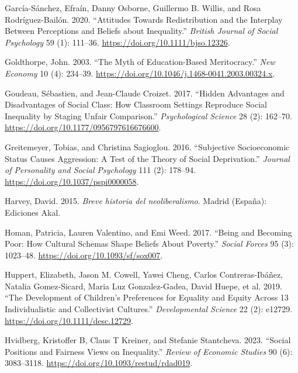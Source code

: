 \documentclass[
  letterpaper,
  DIV=11,
  numbers=noendperiod]{scrartcl}
\newlength{\cslhangindent}
\newlength{\cslentryspacingunit} %
\newenvironment{CSLReferences}[2] %
 {%
  \setlength{\parindent}{0pt}
  \ifodd #1
  \let\oldpar\par
  \def\par{\hangindent=\cslhangindent\oldpar}
  \fi
  \setlength{\parskip}{#2\cslentryspacingunit}
 }%
 {}
\begin{document}
\begin{CSLReferences}{1}{0}
\leavevmode{}%
García-Sánchez, Efraín, Danny Osborne, Guillermo B. Willis, and Rosa
Rodríguez-Bailón. 2020. {``Attitudes Towards Redistribution and the
Interplay Between Perceptions and Beliefs about Inequality.''}
\emph{British Journal of Social Psychology} 59 (1): 111--36.
\url{https://doi.org/10.1111/bjso.12326}.

\leavevmode{}%
Goldthorpe, John. 2003. {``The Myth of Education-Based Meritocracy.''}
\emph{New Economy} 10 (4): 234--39.
\url{https://doi.org/10.1046/j.1468-0041.2003.00324.x}.

\leavevmode{}%
Goudeau, Sébastien, and Jean-Claude Croizet. 2017. {``Hidden
{Advantages} and {Disadvantages} of {Social Class}: {How Classroom
Settings Reproduce Social Inequality} by {Staging Unfair Comparison}.''}
\emph{Psychological Science} 28 (2): 162--70.
\url{https://doi.org/10.1177/0956797616676600}.

\leavevmode{}%
Greitemeyer, Tobias, and Christina Sagioglou. 2016. {``Subjective
Socioeconomic Status Causes Aggression: {A} Test of the Theory of Social
Deprivation.''} \emph{Journal of Personality and Social Psychology} 111
(2): 178--94. \url{https://doi.org/10.1037/pspi0000058}.

\leavevmode{}%
Harvey, David. 2015. \emph{{Breve historia del neoliberalismo}}. Madrid
(Espa{ñ}a): Ediciones Akal.

\leavevmode{}%
Homan, Patricia, Lauren Valentino, and Emi Weed. 2017. {``Being and
{Becoming Poor}: {How Cultural Schemas Shape Beliefs About Poverty}.''}
\emph{Social Forces} 95 (3): 1023--48.
\url{https://doi.org/10.1093/sf/sox007}.

\leavevmode{}%
Huppert, Elizabeth, Jason M. Cowell, Yawei Cheng, Carlos
Contreras-Ibáñez, Natalia Gomez-Sicard, Maria Luz Gonzalez-Gadea, David
Huepe, et al. 2019. {``The Development of Children's Preferences for
Equality and Equity Across 13 Individualistic and Collectivist
Cultures.''} \emph{Developmental Science} 22 (2): e12729.
\url{https://doi.org/10.1111/desc.12729}.

\leavevmode{}%
Hvidberg, Kristoffer B, Claus T Kreiner, and Stefanie Stantcheva. 2023.
{``Social {Positions} and {Fairness Views} on {Inequality}.''}
\emph{Review of Economic Studies} 90 (6): 3083--3118.
\url{https://doi.org/10.1093/restud/rdad019}.


\end{CSLReferences}
\end{document}
